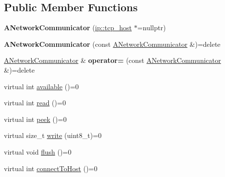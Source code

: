 \subsection*{Public Member Functions}
\begin{DoxyCompactItemize}
\item 
\mbox{\label{classathome_1_1communication_1_1_a_network_communicator_a0c5ca4008e3de2e987d5cafaf9914960}} 
{\bfseries A\+Network\+Communicator} (\mbox{\hyperlink{structathome_1_1communication_1_1ip_1_1s__host}{ip\+::tcp\+\_\+host}} $\ast$=nullptr)
\item 
\mbox{\label{classathome_1_1communication_1_1_a_network_communicator_a3650944e94e130a11bd0167eb55e40c1}} 
{\bfseries A\+Network\+Communicator} (const \mbox{\hyperlink{classathome_1_1communication_1_1_a_network_communicator}{A\+Network\+Communicator}} \&)=delete
\item 
\mbox{\label{classathome_1_1communication_1_1_a_network_communicator_a3d8984345e39d51da706a02c8d751e6b}} 
\mbox{\hyperlink{classathome_1_1communication_1_1_a_network_communicator}{A\+Network\+Communicator}} \& {\bfseries operator=} (const \mbox{\hyperlink{classathome_1_1communication_1_1_a_network_communicator}{A\+Network\+Communicator}} \&)=delete
\item 
virtual int \mbox{\hyperlink{classathome_1_1communication_1_1_a_network_communicator_a2bf367d03c98e8523fda71dd43ffa2fb}{available}} ()=0
\item 
virtual int \mbox{\hyperlink{classathome_1_1communication_1_1_a_network_communicator_a88d3c4366daf48865ab48b22eb62d610}{read}} ()=0
\item 
virtual int \mbox{\hyperlink{classathome_1_1communication_1_1_a_network_communicator_ad06ecdc94aa77b1bab934b85bed2ac7d}{peek}} ()=0
\item 
virtual size\+\_\+t \mbox{\hyperlink{classathome_1_1communication_1_1_a_network_communicator_a87adf68359a4ec5b0a38bea529ebf732}{write}} (uint8\+\_\+t)=0
\item 
virtual void \mbox{\hyperlink{classathome_1_1communication_1_1_a_network_communicator_a5e3b278ad11e6c00ac7d3e2fee3f01b1}{flush}} ()=0
\item 
virtual int \mbox{\hyperlink{classathome_1_1communication_1_1_a_network_communicator_a370176dae8f38225446e83a132dbcff7}{connect\+To\+Host}} ()=0

\end{DoxyCompactItemize}

